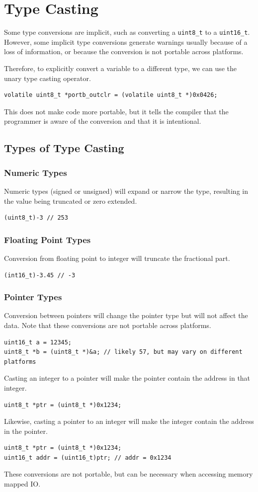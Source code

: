 \documentclass[a4paper]{report}
\begin{document}
\section{Type Casting}
Some type conversions are implicit, such as converting a \texttt{uint8_t}
to a \texttt{uint16_t}. However, some implicit type conversions generate warnings
usually because of a loss of information, or because the conversion is not portable across
platforms.

Therefore, to explicitly convert a variable to a different type, we can use the unary type casting operator.
\begin{verbatim}
volatile uint8_t *portb_outclr = (volatile uint8_t *)0x0426;
\end{verbatim}
This does not make code more portable, but it tells the compiler that
the programmer is aware of the conversion and that it is intentional.
\subsection{Types of Type Casting}
\subsubsection{Numeric Types}
Numeric types (signed or unsigned) will expand or narrow the type,
resulting in the value being truncated or zero extended.
\begin{verbatim}
(uint8_t)-3 // 253
\end{verbatim}
\subsubsection{Floating Point Types}
Conversion from floating point to integer will truncate the fractional part.
\begin{verbatim}
(int16_t)-3.45 // -3
\end{verbatim}
\subsubsection{Pointer Types}
Conversion between pointers will change the pointer type but will not affect the
data. Note that these conversions are not portable across platforms.
\begin{verbatim}
uint16_t a = 12345;
uint8_t *b = (uint8_t *)&a; // likely 57, but may vary on different platforms
\end{verbatim}
Casting an integer to a pointer will make the pointer contain the address in that integer.
\begin{verbatim}
uint8_t *ptr = (uint8_t *)0x1234;
\end{verbatim}
Likewise, casting a pointer to an integer will make the integer contain the address in the pointer.
\begin{verbatim}
uint8_t *ptr = (uint8_t *)0x1234;
uint16_t addr = (uint16_t)ptr; // addr = 0x1234
\end{verbatim}
These conversions are not portable, but can be necessary when accessing memory mapped IO\@.
\end{document}
